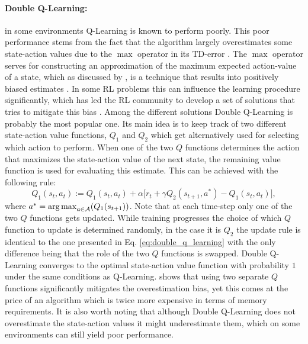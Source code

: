 \paragraph{Double Q-Learning:} in some environments Q-Learning is known to perform poorly. This poor performance stems from the fact that the algorithm largely overestimates some state-action values due to the $\max$ operator in its TD-error \cite{thrun1993issues}. The $\max$ operator serves for constructing an approximation of the maximum expected action-value of a state, which as discussed by \citet{hasselt2010double}, is a technique that results into positively biased estimates \cite{van2004rational,smith2006optimizer}. In some RL problems this can influence the learning procedure significantly, which has led the RL community to develop a set of solutions that tries to mitigate this bias \cite{lee2013bias,lee2019bias,zhu2020self,pentaliotis2021variation}. Among the different solutions Double Q-Learning \cite{hasselt2010double} is probably the most popular one. Its main idea is to keep track of two different state-action value functions, $Q_1$ and $Q_2$ which get alternatively used for selecting which action to perform. When one of the two $Q$ functions determines the action that maximizes the state-action value of the next state, the remaining value function is used for evaluating this estimate. This can be achieved with the following rule:
\begin{equation}
	Q_1(s_t,a_t):=Q_1(s_t,a_t) + \alpha\big[r_t + \gamma Q_2(s_{t+1},a^{*}) - Q_1(s_t, a_t) \big],
\label{eq:double_q_learning}
\end{equation}
where $a^{*}=\operatorname*{arg\,max}_{a\in \mathcal{A}}(Q_1(s_{t+1}))$. Note that at each time-step only one of the two $Q$ functions gets updated. While training progresses the choice of which $Q$ function to update is determined randomly, in the case it is $Q_2$ the update rule is identical to the one presented in Eq. \ref{eq:double_q_learning} with the only difference being that the role of the two $Q$ functions is swapped. Double Q-Learning converges to the optimal state-action value function with probability $1$ under the same conditions as Q-Learning. \citet{hasselt2010double} shows that using two separate $Q$ functions significantly mitigates the overestimation bias, yet this comes at the price of an algorithm which is twice more expensive in terms of memory requirements. It is also worth noting that although Double Q-Learning does not overestimate the state-action values it might underestimate them, which on some environments can still yield poor performance.


